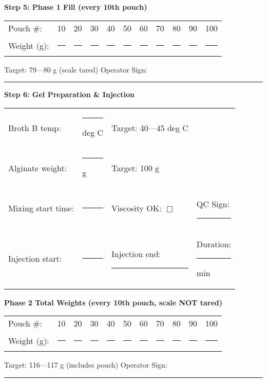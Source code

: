 {\noindent\textbf{Step 5: Phase 1 Fill (every 10th pouch)}

\begin{tabular}{@{}lcccccccccc@{}}
Pouch \#: & 10 & 20 & 30 & 40 & 50 & 60 & 70 & 80 & 90 & 100 \\
Weight (g): & \rule{1cm}{0.4pt} & \rule{1cm}{0.4pt} & \rule{1cm}{0.4pt} & \rule{1cm}{0.4pt} & \rule{1cm}{0.4pt} & \rule{1cm}{0.4pt} & \rule{1cm}{0.4pt} & \rule{1cm}{0.4pt} & \rule{1cm}{0.4pt} & \rule{1cm}{0.4pt} \\
\end{tabular}

\noindent Target: 79---80 g (scale tared) \hspace{2cm} Operator Sign: \rule{3cm}{0.4pt}

\vspace{1em}

\noindent\textbf{Step 6: Gel Preparation \& Injection}

\begin{tabular}{@{}lp{3cm}p{3cm}p{3cm}@{}}
Broth B temp: & \rule{2.5cm}{0.4pt} deg C & Target: 40---45 deg C & \\
Alginate weight: & \rule{2.5cm}{0.4pt} g & Target: 100 g & \\
Mixing start time: & \rule{2.5cm}{0.4pt} & Viscosity OK: $\Box$ & QC Sign: \rule{2cm}{0.4pt} \\
Injection start: & \rule{2.5cm}{0.4pt} & Injection end: \rule{2.5cm}{0.4pt} & Duration: \rule{2cm}{0.4pt} min \\
\end{tabular}

\vspace{0.5em}

\noindent\textbf{Phase 2 Total Weights (every 10th pouch, scale NOT tared)}

\begin{tabular}{@{}lcccccccccc@{}}
Pouch \#: & 10 & 20 & 30 & 40 & 50 & 60 & 70 & 80 & 90 & 100 \\
Weight (g): & \rule{1cm}{0.4pt} & \rule{1cm}{0.4pt} & \rule{1cm}{0.4pt} & \rule{1cm}{0.4pt} & \rule{1cm}{0.4pt} & \rule{1cm}{0.4pt} & \rule{1cm}{0.4pt} & \rule{1cm}{0.4pt} & \rule{1cm}{0.4pt} & \rule{1cm}{0.4pt} \\
\end{tabular}

\noindent Target: 116---117 g (includes pouch) \hspace{2cm} Operator Sign: \rule{3cm}{0.4pt}

\vspace{1em}

}

